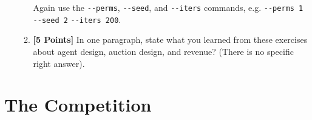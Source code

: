 \documentclass[11pt]{article}
\newcommand{\points}[1]{\textbf{[#1 Points]}}
\begin{document}
\begin{enumerate}
\begin{enumerate}
				Again use the \verb+--perms+, \verb+--seed+, and \verb+--iters+ commands, e.g. \verb+--perms 1 --seed 2+ \verb+--iters 200+.
			
                              \item \points{5} In one paragraph,
state what
                                you learned from these exercises
                                about agent design,
                                auction design, and revenue? (There
                                is no specific right answer).
			\end{enumerate}

\end{enumerate}

\section{The Competition}
	
\end{document}
